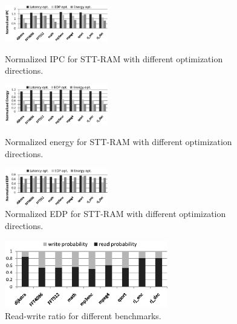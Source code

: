 \begin{figure}[t]
\centering
\includegraphics[width=0.4\textwidth]{fig/IPC}
\vspace{-10pt}
\caption{Normalized IPC for STT-RAM with different optimization directions.}
\label{fig:pic}
\vspace{7pt}
\includegraphics[width=0.4\textwidth]{fig/Energy}
\vspace{-10pt}
\caption{Normalized energy for STT-RAM with different optimization directions.}
\label{fig:energy}
\vspace{7pt}
\includegraphics[width=0.4\textwidth]{fig/EDP}
\vspace{-10pt}
\caption{Normalized EDP for STT-RAM with different optimization directions.}
\label{fig:edp}
\vspace{-10pt}
\end{figure} 

\begin{figure}[t]
  \centering
  \includegraphics[width=2.8in]{fig/RWratio.eps}
  \vspace{-10pt}
  \caption{Read-write ratio for different benchmarks.}
  \label{fig:ratio}
\vspace{-15pt}
\end{figure}